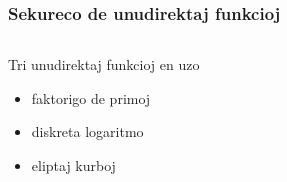 \documentclass[utf8, aspectratio=169]{beamer}
\begin{document}
\begin{frame}
  \frametitle{Sekureco de unudirektaj funkcioj}
  \begin{columns}
    \begin{column}{0.5\textwidth}
      Tri unudirektaj funkcioj en uzo
      \begin{itemize}
      \item faktorigo de primoj
      \item diskreta logaritmo
      \item eliptaj kurboj
      \end{itemize}
    \end{column}
    \begin{column}{0.5\textwidth}

    \end{column}
  \end{columns}
\end{frame}
\end{document}
